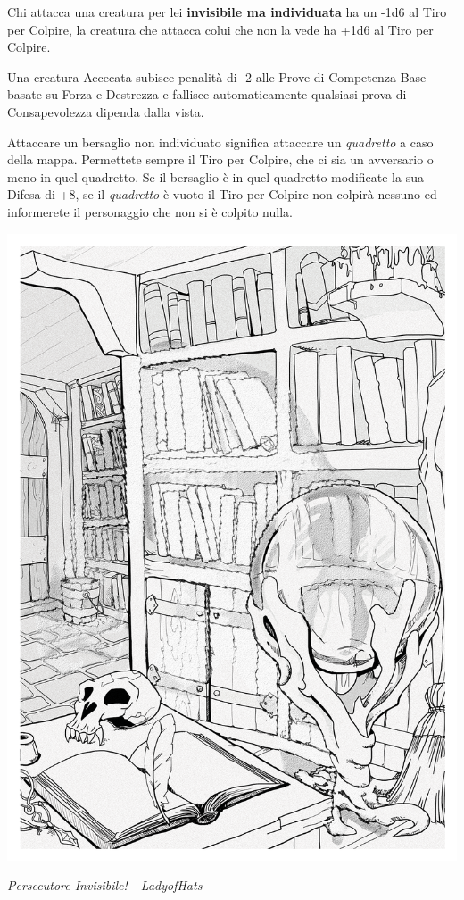 \begin{multicols}{2}
Chi attacca una creatura per lei \textbf{invisibile ma individuata} ha un -1d6 al Tiro per Colpire, la creatura che attacca colui che non la vede ha +1d6 al Tiro per Colpire.

Una creatura Accecata subisce penalità di -2 alle Prove di Competenza Base basate su Forza e Destrezza e fallisce automaticamente qualsiasi prova di Consapevolezza dipenda dalla vista.

Attaccare un bersaglio non individuato significa attaccare un \emph{quadretto} a caso della mappa. Permettete sempre il Tiro per Colpire, che ci sia un avversario o meno in quel quadretto. Se il bersaglio è in quel quadretto modificate la sua Difesa di +8, se il \emph{quadretto} è vuoto il Tiro per Colpire non colpirà nessuno ed informerete il personaggio che non si è colpito nulla.

\medskip
\begin{center}

	\includegraphics[width=0.8\linewidth]{immagini/DnD_Invisible_stalker.png}

	\textit{Persecutore Invisibile! - LadyofHats}

\end{center}


\end{multicols}
